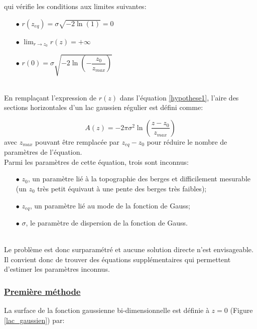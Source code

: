 \noindent qui vérifie les conditions aux limites suivantes:

\begin{itemize}
	\item[$\bullet$]  $r(z_{eq})= \sigma\sqrt{-2\ln(1)}=0$
	\item[$\bullet$]  $\lim_{r\to z_0} r(z) = +\infty$
	\item[$\bullet$]  $r(0)= \sigma\sqrt{-2\ln\left(-\dfrac{z_0}{z_{max}}\right)}$
\end{itemize}

~\\
\noindent En remplaçant l'expression de $r(z)$ dans l'équation \ref{hypothese1}, l'aire des sections horizontales d'un lac gaussien régulier est défini comme:

\begin{equation}
\label{eq:hypso_gaussian}
A(z) = -2\pi\sigma^2\ln\left(\frac{z-z_0}{z_{max}}\right)
\end{equation}
avec $z_{max}$ pouvant être remplacée par $z_{eq}-z_0$ pour réduire le nombre de paramètres de l'équation.\\

\noindent Parmi les paramètres de cette équation, trois sont inconnus: 

\begin{itemize}
\item[$\bullet$] $z_{0}$, un paramètre lié à la topographie des berges et difficilement mesurable (un $z_0$ très petit équivaut à une pente des berges très faibles);
\item[$\bullet$] $z_{eq}$, un paramètre lié au mode de la fonction de Gauss;
\item[$\bullet$] $\sigma$, le paramètre de dispersion de la fonction de Gauss.
\end{itemize}
~\\
Le problème est donc surparamétré et aucune solution directe n'est envisageable. Il convient donc de trouver des équations supplémentaires qui permettent d'estimer les paramètres inconnus.\\

\subsubsection*{\underline{{\selectfont Première méthode }}}

\noindent La surface de la fonction gaussienne bi-dimensionnelle est définie à $z=0$ (Figure \ref{lac_gaussien}) par:


